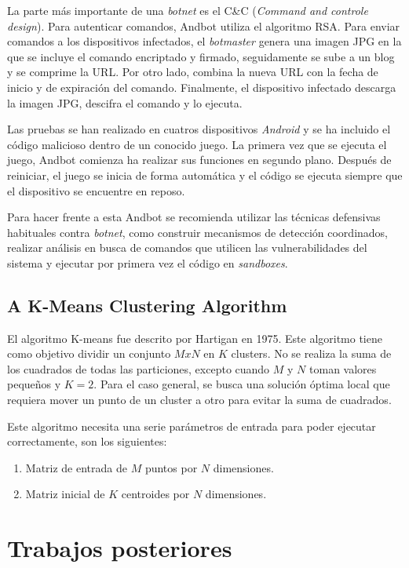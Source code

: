 \documentclass[a4paper,11pt]{report}
\begin{document}
La parte más importante de una \emph{botnet} es el C\&{}C (\emph{Command and controle design}). Para autenticar comandos, Andbot utiliza el algoritmo RSA. Para enviar comandos a los dispositivos infectados, el \emph{botmaster} genera una imagen JPG en la que se incluye el comando encriptado y firmado, seguidamente se sube a un blog y se comprime la URL. Por otro lado, combina la nueva URL con la fecha de inicio y de expiración del comando. Finalmente, el dispositivo infectado descarga la imagen JPG, descifra el comando y lo ejecuta.

Las pruebas se han realizado en cuatros dispositivos \emph{Android} y se ha incluido el código malicioso dentro de un conocido juego. La primera vez que se ejecuta el juego, Andbot comienza ha realizar sus funciones en segundo plano. Después de reiniciar, el juego se inicia de forma automática y el código se ejecuta siempre que el dispositivo se encuentre en reposo.

Para hacer frente a esta Andbot se recomienda utilizar las técnicas defensivas habituales contra \emph{botnet}, como construir mecanismos de detección coordinados, realizar análisis en busca de comandos que utilicen las vulnerabilidades del sistema y ejecutar por primera vez el código en \emph{sandboxes}.

\section{A K-Means Clustering Algorithm}

El algoritmo K-means \cite{k-means} fue descrito por Hartigan en 1975. Este algoritmo tiene como objetivo dividir un conjunto $MxN$ en $K$ clusters. No se realiza la suma de los cuadrados de todas las particiones, excepto cuando $M$ y $N$ toman valores pequeños y $K=2$. Para el caso general, se busca una solución óptima local que requiera mover un punto de un cluster a otro para evitar la suma de cuadrados.

Este algoritmo necesita una serie parámetros de entrada para poder ejecutar correctamente, son los siguientes:

\begin{enumerate}
\item Matriz de entrada de $M$ puntos por $N$ dimensiones.
\item Matriz inicial de $K$ centroides por $N$ dimensiones.
\end{enumerate}


\chapter{Trabajos posteriores} \label{tPosteriores}
\end{document}
